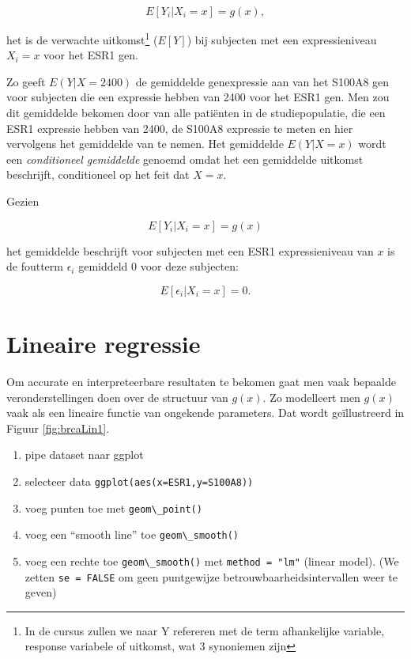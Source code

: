 \documentclass[
  12pt,dutch,coursenotes]{book}
\newcommand{\passthrough}[1]{#1}
\providecommand{\tightlist}{%
  \setlength{\itemsep}{0pt}\setlength{\parskip}{0pt}}
\theoremstyle{definition}
\theoremstyle{definition}
\theoremstyle{definition}
\theoremstyle{definition}
\theoremstyle{remark}
\begin{document}
\[E[Y_i|X_i=x]=g(x),\]

het is de verwachte uitkomst\footnote{In de cursus zullen we naar Y refereren met de term afhankelijke variable, response variabele of uitkomst, wat 3 synoniemen zijn} (\(E[Y]\)) bij subjecten met een expressieniveau \(X_i=x\) voor het ESR1 gen.

Zo geeft \(E(Y|X=2400)\) de gemiddelde genexpressie aan van het S100A8 gen voor subjecten die een expressie hebben van 2400 voor het ESR1 gen.
Men zou dit gemiddelde bekomen door van alle patiënten in de studiepopulatie, die een ESR1 expressie hebben van 2400, de S100A8 expressie te meten en hier vervolgens het gemiddelde van te nemen.
Het gemiddelde \(E(Y|X=x)\) wordt
een \emph{conditioneel gemiddelde} genoemd omdat het een gemiddelde
uitkomst beschrijft, conditioneel op het feit dat \(X=x\).

Gezien

\[E[Y_i|X_i=x]=g(x)\]

het gemiddelde beschrijft voor subjecten met een ESR1 expressieniveau van \(x\) is de foutterm \(\epsilon_i\) gemiddeld 0 voor deze subjecten:

\[E[\epsilon_i\vert X_i=x]=0.\]

\hypertarget{lineaire-regressie}{%
\section{Lineaire regressie}\label{lineaire-regressie}}

Om accurate en interpreteerbare resultaten te bekomen gaat men vaak bepaalde veronderstellingen doen over de structuur van \(g(x)\).
Zo modelleert men \(g(x)\) vaak als een lineaire functie van ongekende parameters.
Dat wordt geïllustreerd in Figuur \ref{fig:brcaLin1}.

\begin{enumerate}
\def\labelenumi{\arabic{enumi}.}
\tightlist
\item
  pipe dataset naar ggplot
\item
  selecteer data \passthrough{\lstinline!ggplot(aes(x=ESR1,y=S100A8))!}
\item
  voeg punten toe met \passthrough{\lstinline!geom\_point()!}
\item
  voeg een ``smooth line'' toe \passthrough{\lstinline!geom\_smooth()!}
\item
  voeg een rechte toe \passthrough{\lstinline!geom\_smooth()!} met \passthrough{\lstinline!method = "lm"!} (linear model). (We zetten \passthrough{\lstinline!se = FALSE!} om geen puntgewijze betrouwbaarheidsintervallen weer te geven)
\end{enumerate}
\end{document}
